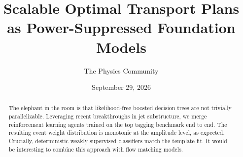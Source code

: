 \documentclass[11pt]{article}
\title{Scalable Optimal Transport Plans as Power-Suppressed Foundation Models}
\author{The Physics Community}
\date{September 29, 2026}
\numberwithin{equation}{section}
\theoremstyle{definition}
\theoremstyle{remark}
\begin{document}
\maketitle
\begin{abstract}
The elephant in the room is that likelihood-free boosted decision trees
are not trivially parallelizable. Leveraging recent breakthroughs in jet
substructure, we merge reinforcement learning agents trained on the top
tagging benchmark end to end. The resulting event weight distribution is
monotonic at the amplitude level, as expected. Crucially, deterministic
weakly supervised classifiers match the template fit. It would be
interesting to combine this approach with flow matching models.
\end{abstract}
\tableofcontents




\nocite{*}


\end{document}
